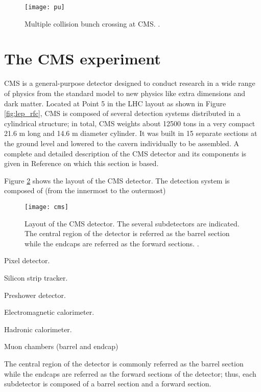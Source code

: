 \begin{figure}[!h]
\centering
\texttt{[image: pu]}
\caption [Multiple \pp collision bunch crossing at CMS.]{Multiple \pp collision bunch crossing at CMS. %
\cite{pu}. }\label{fig:pu}
\end{figure}

\section{The CMS experiment}

CMS is a general-purpose detector designed to conduct research in a wide range of physics from the standard model to new physics like extra dimensions and dark matter. Located at Point 5 in the LHC layout as shown in Figure \ref{fig:lep_rfc}, CMS is composed of several detection systems distributed in a cylindrical structure; in total, CMS weights about 12500 tons in a very compact 21.6 m long and 14.6 m diameter cylinder. It was built in 15 separate sections at the ground level and lowered to the cavern individually to be assembled. A complete and detailed description of the CMS detector and its components is given in Reference \cite{cms} on which this section is based.

\noindent Figure \ref{fig:cms} shows the layout of the CMS detector. The detection system is composed of (from the innermost to the outermost)

\begin{figure}[!h]
  \centering
  \texttt{[image: cms]}
  \caption[Layout of the CMS detector]{Layout of the CMS detector. The several subdetectors are indicated. The central region of the detector is referred as the barrel section while the endcaps are referred as the forward sections. \cite{cms_drawing}.}
  \label{fig:cms}
\end{figure}

\bit
\item Pixel detector.
\item Silicon strip tracker.
\item Preshower detector.
\item Electromagnetic calorimeter.
\item Hadronic calorimeter.
\item Muon chambers (barrel and endcap)
\eit

The central region of the detector is commonly referred as the barrel section while the endcaps are referred as the forward sections of the detector; thus, each subdetector is composed of a barrel section and a forward section. 


